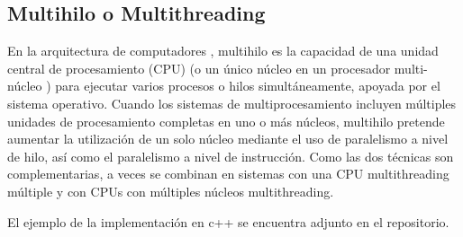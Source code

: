 \documentclass{article}
\begin{document}
\subsection{Multihilo o Multithreading}
En la arquitectura de computadores , multihilo es la capacidad de una unidad central de procesamiento (CPU) (o un único núcleo en un procesador multi-núcleo ) para ejecutar varios procesos o hilos simultáneamente, apoyada por el sistema operativo. Cuando los sistemas de multiprocesamiento incluyen múltiples unidades de procesamiento completas en uno o más núcleos, multihilo pretende aumentar la utilización de un solo núcleo mediante el uso de paralelismo a nivel de hilo\cite{para1}, así como el paralelismo a nivel de instrucción\cite{para2}. Como las dos técnicas son complementarias, a veces se combinan en sistemas con una CPU multithreading múltiple y con CPUs con múltiples núcleos multithreading\cite{multi}.

El ejemplo de la implementación en c++ se encuentra adjunto en el repositorio.



\end{document}
